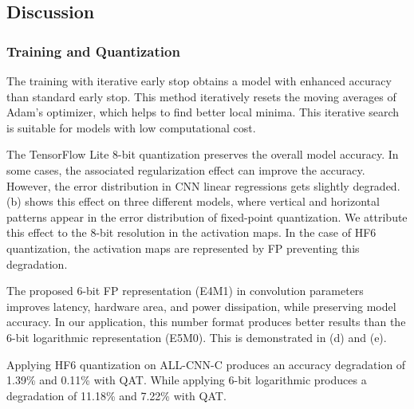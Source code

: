 \subsection{Discussion}
\subsubsection{Training and Quantization}
The training with iterative early stop obtains a model with enhanced accuracy than standard early stop. This method iteratively resets the moving averages of Adam's optimizer, which helps to find better local minima. This iterative search is suitable for models with low computational cost.

The TensorFlow Lite 8-bit quantization preserves the overall model accuracy. In some cases, the associated regularization effect can improve the accuracy. However, the error distribution in CNN linear regressions gets slightly degraded. (b) shows this effect on three different models, where vertical and horizontal patterns appear in the error distribution of fixed-point quantization. We attribute this effect to the 8-bit resolution in the activation maps. In the case of HF6 quantization, the activation maps are represented by FP preventing this degradation.

The proposed 6-bit FP representation (E4M1) in convolution parameters improves latency, hardware area, and power dissipation, while preserving model accuracy. In our application, this number format produces better results than the 6-bit logarithmic representation (E5M0). This is demonstrated in (d) and (e).

Applying HF6 quantization on ALL-CNN-C \cite{springenberg2014striving} produces an accuracy degradation of 1.39\% and 0.11\% with QAT. While applying 6-bit logarithmic produces a degradation of 11.18\% and 7.22\% with QAT.


